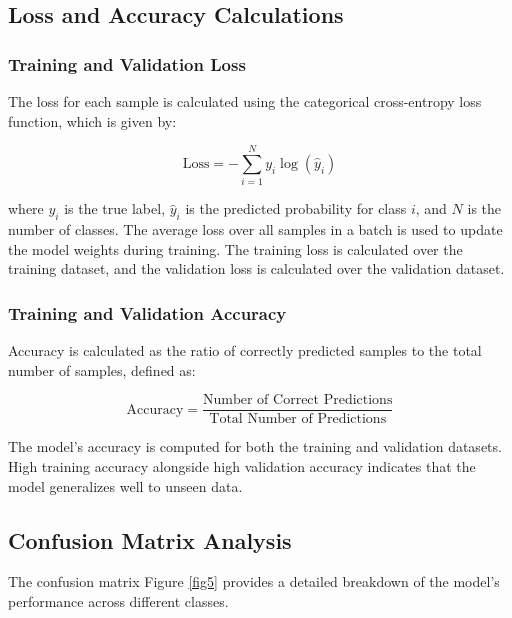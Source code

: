 \documentclass[conference]{IEEEtran}
\begin{document}
\subsection{Loss and Accuracy Calculations}
\subsubsection{Training and Validation Loss}
The loss for each sample is calculated using the categorical cross-entropy loss function, which is given by:

\[
\text{Loss} = -\sum_{i=1}^{N} y_i \log(\hat{y}_i)
\]

where $y_i$ is the true label, $\hat{y}_i$ is the predicted probability for class $i$, and $N$ is the number of classes.
The average loss over all samples in a batch is used to update the model weights during training. The training loss is calculated over the training dataset, and the validation loss is calculated over the validation dataset.

\subsubsection{Training and Validation Accuracy}
Accuracy is calculated as the ratio of correctly predicted samples to the total number of samples, defined as:

\[
    \text{Accuracy} = \frac{\text{Number of Correct Predictions}}{\text{Total Number of Predictions}}
\]

The model's accuracy is computed for both the training and validation datasets. High training accuracy alongside high validation accuracy indicates that the model generalizes well to unseen data.

\subsection{Confusion Matrix Analysis}
The confusion matrix Figure \ref{fig5} provides a detailed breakdown of the model's performance across different classes.
\end{document}
